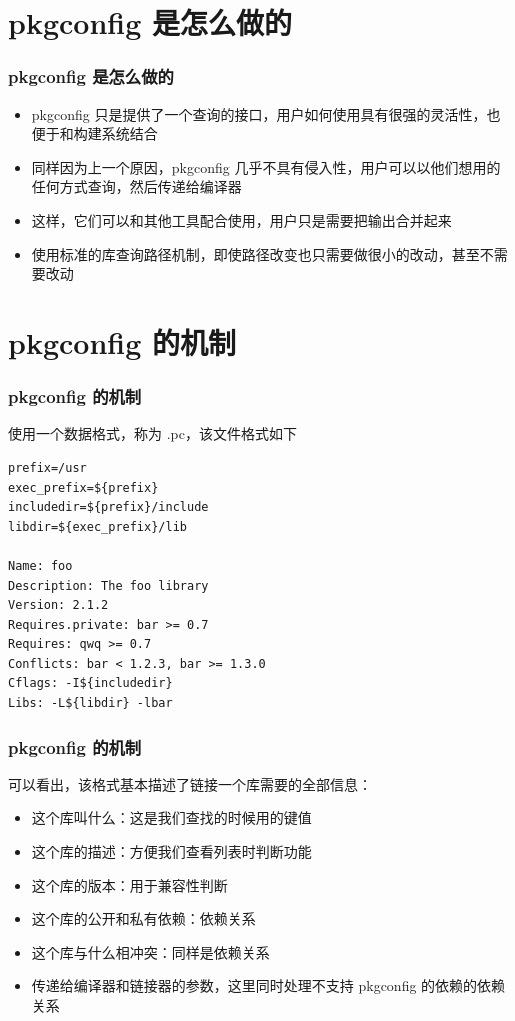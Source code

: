 \documentclass[UTF-8]{ctexbeamer}
\begin{document}
\section{pkgconfig 是怎么做的}
\begin{frame}
	\frametitle{pkgconfig 是怎么做的}

	\begin{itemize}
		\item pkgconfig 只是提供了一个查询的接口，用户如何使用具有很强的灵活性，也便于和构建系统结合
		\item 同样因为上一个原因，pkgconfig 几乎不具有侵入性，用户可以以他们想用的任何方式查询，然后传递给编译器
		\item 这样，它们可以和其他工具配合使用，用户只是需要把输出合并起来
		\item 使用标准的库查询路径机制，即使路径改变也只需要做很小的改动，甚至不需要改动
	\end{itemize}
\end{frame}

\section{pkgconfig 的机制}
\begin{frame}[fragile]
	\frametitle{pkgconfig 的机制}
	
	使用一个数据格式，称为 .pc，该文件格式如下
	\begin{verbatim}
prefix=/usr
exec_prefix=${prefix}
includedir=${prefix}/include
libdir=${exec_prefix}/lib

Name: foo
Description: The foo library
Version: 2.1.2
Requires.private: bar >= 0.7
Requires: qwq >= 0.7
Conflicts: bar < 1.2.3, bar >= 1.3.0
Cflags: -I${includedir}
Libs: -L${libdir} -lbar
	\end{verbatim}
\end{frame}

\begin{frame}[fragile]
	\frametitle{pkgconfig 的机制}
	
	可以看出，该格式基本描述了链接一个库需要的全部信息：
	\begin{itemize}
		\item 这个库叫什么：这是我们查找的时候用的键值
		\item 这个库的描述：方便我们查看列表时判断功能
		\item 这个库的版本：用于兼容性判断
		\item 这个库的公开和私有依赖：依赖关系
		\item 这个库与什么相冲突：同样是依赖关系
		\item 传递给编译器和链接器的参数，这里同时处理不支持 pkgconfig 的依赖的依赖关系
	\end{itemize}
\end{frame}
\end{document}

